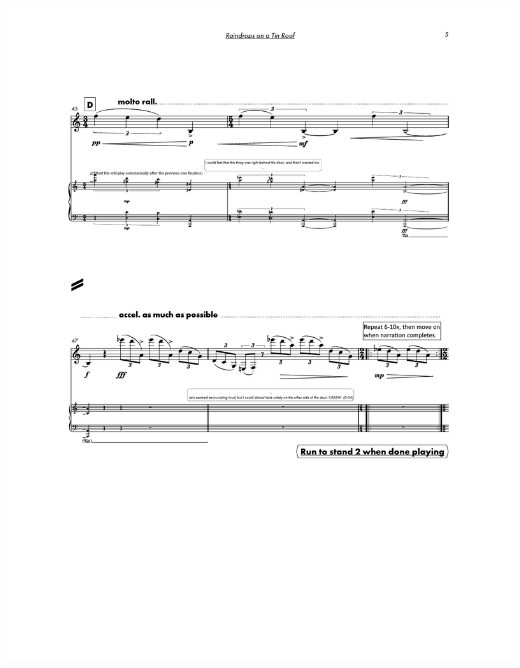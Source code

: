 \begin{center}
     \includegraphics[scale=0.75]{Scores/raindrops_Part11.pdf}
\end{center}
\newpage
